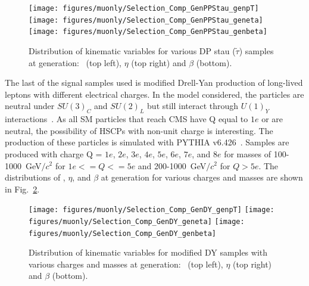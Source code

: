 \begin{figure}
 \begin{center}
  \texttt{[image: figures/muonly/Selection\_Comp\_GenPPStau\_genpT]}
  \texttt{[image: figures/muonly/Selection\_Comp\_GenPPStau\_geneta]}
  \texttt{[image: figures/muonly/Selection\_Comp\_GenPPStau\_genbeta]}
 \end{center}
 \caption[Distribution of \pt, $\eta$, and $\beta$ for various DP stau samples at generation]
{Distribution of kinematic variables for various DP stau ($\tilde{\tau}$) samples at generation:
\pt\ (top left), $\eta$ (top right) and $\beta$ (bottom).
   \label{fig:GenPPStau}}
\end{figure}

The last of the signal samples used is modified Drell-Yan production of long-lived leptons with different electrical charges.
In the model considered, the particles are neutral under $SU(3)_C$ and $SU(2)_L$ but still interact through $U(1)_Y$ interactions~\cite{Langacker:2011db}.
As all SM particles that reach CMS have Q equal to $1e$ or
are neutral, the possibility of HSCPs with non-unit charge is interesting. 
The production of these particles is simulated with PYTHIA v6.426~\cite{Sjostrand:2006za}. 
Samples are produced with charge Q = $1e$, $2e$, $3e$, $4e$, $5e$, $6e$, $7e$, and $8e$ for masses of 
100-1000~GeV$/c^2$ for $1e <= Q <= 5e$ and 200-1000~GeV$/c^2$ for $Q > 5e$.
The distributions of \pt, $\eta$, and $\beta$ at generation for various charges and masses are shown in Fig.~\ref{fig:GenDY}.

\begin{figure}
 \begin{center}
  \texttt{[image: figures/muonly/Selection\_Comp\_GenDY\_genpT]}
  \texttt{[image: figures/muonly/Selection\_Comp\_GenDY\_geneta]}
  \texttt{[image: figures/muonly/Selection\_Comp\_GenDY\_genbeta]}
 \end{center}
 \caption[Distribution of \pt, $\eta$, and $\beta$ for modified DY samples with various charges and masses at generation]
{Distribution of kinematic variables for modified DY samples with various charges and masses at generation:
\pt\ (top left), $\eta$ (top right) and $\beta$ (bottom).
}
   \label{fig:GenDY}
\end{figure}

